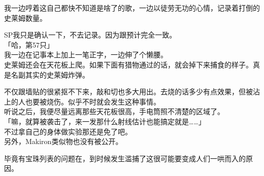 我一边哼着这自己都快不知道是啥了的歌，一边以徒劳无功的心情，记录着打倒的史莱姆数量。

SP我只是确认一下，不去记录。因为跟预计完全一致。\\

「哈，第57只」\\

我一边在记事本上加上一笔正字，一边伸了个懒腰。\\

史莱姆还会在天花板上爬。如果下面有猎物通过的话，就会掉下来捕食的样子。真是名副其实的史莱姆炸弹。

不仅跟墙贴的很紧抠不下来，敲和切也多大用出。去烧的话多少有点效果，但被沾上的人也要被烧伤。似乎不时就会发生这种事情。\\

听说之后，我便尽量远离那些天花板很高，手电筒照不清楚的区域了。\\

「嘛，就算被袭击了，来一发那什么射线估计也能搞定就是……」\\

不过拿自己的身体做实验那还是免了吧。\\

另外，Makiron类似物也没有被公开。

毕竟有宝珠列表的问题在，到时候发生滥捕了这很可能要变成人们一哄而入的原因。\\

